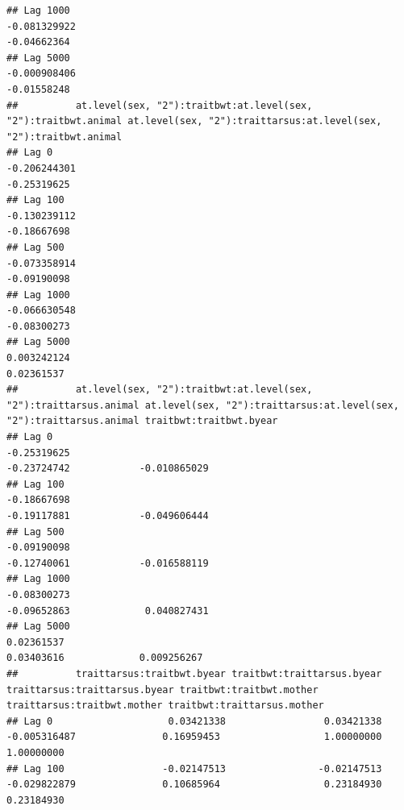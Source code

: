 \documentclass[
  12pt,
]{book}
\begin{document}
\begin{verbatim}
## Lag 1000                                                      -0.081329922                                                          -0.04662364
## Lag 5000                                                      -0.000908406                                                          -0.01558248
##          at.level(sex, "2"):traitbwt:at.level(sex, "2"):traitbwt.animal at.level(sex, "2"):traittarsus:at.level(sex, "2"):traitbwt.animal
## Lag 0                                                      -0.206244301                                                       -0.25319625
## Lag 100                                                    -0.130239112                                                       -0.18667698
## Lag 500                                                    -0.073358914                                                       -0.09190098
## Lag 1000                                                   -0.066630548                                                       -0.08300273
## Lag 5000                                                    0.003242124                                                        0.02361537
##          at.level(sex, "2"):traitbwt:at.level(sex, "2"):traittarsus.animal at.level(sex, "2"):traittarsus:at.level(sex, "2"):traittarsus.animal traitbwt:traitbwt.byear
## Lag 0                                                          -0.25319625                                                          -0.23724742            -0.010865029
## Lag 100                                                        -0.18667698                                                          -0.19117881            -0.049606444
## Lag 500                                                        -0.09190098                                                          -0.12740061            -0.016588119
## Lag 1000                                                       -0.08300273                                                          -0.09652863             0.040827431
## Lag 5000                                                        0.02361537                                                           0.03403616             0.009256267
##          traittarsus:traitbwt.byear traitbwt:traittarsus.byear traittarsus:traittarsus.byear traitbwt:traitbwt.mother traittarsus:traitbwt.mother traitbwt:traittarsus.mother
## Lag 0                    0.03421338                 0.03421338                  -0.005316487               0.16959453                  1.00000000                  1.00000000
## Lag 100                 -0.02147513                -0.02147513                  -0.029822879               0.10685964                  0.23184930                  0.23184930

\end{verbatim}
\end{document}
